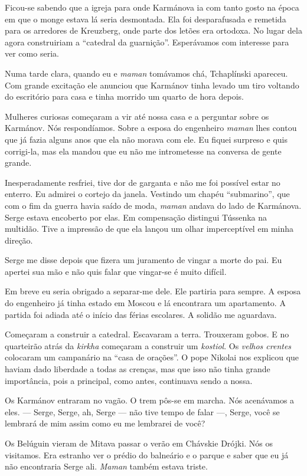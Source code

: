Ficou-se sabendo que a igreja para onde Karmánova ia com tanto gosto na
época em que o monge estava lá seria desmontada. Ela foi desparafusada e
remetida para os arredores de Kreuzberg, onde parte dos letões era
ortodoxa. No lugar dela agora construiriam a ``catedral da guarnição''.
Esperávamos com interesse para ver como seria.

Numa tarde clara, quando eu e \emph{maman} tomávamos chá, Tchaplínski
apareceu. Com grande excitação ele anunciou que Karmánov tinha levado um
tiro voltando do escritório para casa e tinha morrido um quarto de hora
depois.

Mulheres curiosas começaram a vir até nossa casa e a perguntar sobre os
Karmánov. Nós respondíamos. Sobre a esposa do engenheiro \emph{maman}
lhes contou que já fazia alguns anos que ela não morava com ele. Eu
fiquei surpreso e quis corrigi-la, mas ela mandou que eu não me
intrometesse na conversa de gente grande.

Inesperadamente resfriei, tive dor de garganta e não me foi possível
estar no enterro. Eu admirei o cortejo da janela. Vestindo um chapéu
``submarino'', que com o fim da guerra havia saído de moda, \emph{maman}
andava do lado de Karmánova. Serge estava encoberto por elas. Em
compensação distingui Tússenka na multidão. Tive a impressão de que ela
lançou um olhar imperceptível em minha direção.

Serge me disse depois que fizera um juramento de vingar a morte do pai.
Eu apertei sua mão e não quis falar que vingar-se é muito difícil.

Em breve eu seria obrigado a separar-me dele. Ele partiria para sempre.
A esposa do engenheiro já tinha estado em Moscou e lá encontrara um
apartamento. A partida foi adiada até o início das férias escolares. A
solidão me aguardava.

Começaram a construir a catedral. Escavaram a terra. Trouxeram gobos. E
no quarteirão atrás da \emph{kirkha} começaram a construir um
\emph{kostiol}. Os \emph{velhos crentes} colocaram um campanário na
``casa de orações''. O pope Nikolai nos explicou que haviam dado
liberdade a todas as crenças, mas que isso não tinha grande importância,
pois a principal, como antes, continuava sendo a nossa.

Os Karmánov entraram no vagão. O trem pôs-se em marcha. Nós acenávamos a
eles. --- Serge, Serge, ah, Serge --- não tive tempo de falar ---,
Serge, você se lembrará de mim assim como eu me lembrarei de você?

Os Belúguin vieram de Mitava passar o verão em Chávskie Drójki. Nós os
visitamos. Era estranho ver o prédio do balneário e o parque e saber que
eu já não encontraria Serge ali. \emph{Maman} também estava triste.

